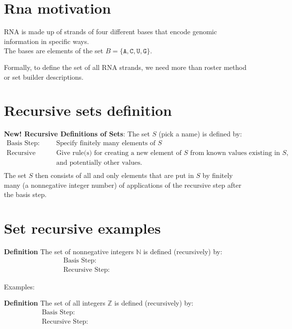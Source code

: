 \documentclass[12pt, oneside]{article}
\newcommand{\A}[0]{\texttt{A}}
\newcommand{\C}[0]{\texttt{C}}
\newcommand{\G}[0]{\texttt{G}}
\newcommand{\U}[0]{\texttt{U}}
\begin{document}
\begin{flushright}
\end{flushright} \section*{Rna motivation}


RNA is made up of strands of four different bases that encode genomic information
in specific ways.\\
The bases are elements of the set 
$B  = \{\A, \C, \U, \G \}$.


Formally, to define the set of all RNA strands, we need more than roster
method or set builder descriptions. 

 \vfill
\section*{Recursive sets definition}


{\bf New! Recursive Definitions of Sets}: The set $S$ (pick a name) is defined by:
\[
\begin{array}{ll}
\textrm{Basis Step: } & \textrm{Specify finitely many elements of } S\\
\textrm{Recursive Step: } & \textrm{Give rule(s) for creating a new element of } S \textrm{ from known values existing in } S, \\
& \textrm{and potentially other values}. \\
\end{array}
\]
The set $S$ then consists of all and only elements that are put in $S$ by finitely many (a nonnegative integer number) of
applications of the recursive step after the basis step. \vfill
\section*{Set recursive examples}


{\bf Definition} The set of nonnegative integers $\mathbb{N}$ is defined (recursively) by: 
\[
\begin{array}{ll}
\textrm{Basis Step: } & \phantom{0 \in \mathbb{N}} \\
\textrm{Recursive Step: } & \phantom{\textrm{If } n \in \mathbb{N} \textrm{, then } n+1 \in \mathbb{N}}
\end{array}
\]

Examples: 

{\bf Definition} The set of all integers $\mathbb{Z}$ is defined (recursively) by: 
\[
\begin{array}{ll}
\textrm{Basis Step: } & \phantom{0 \in \mathbb{Z}} \\
\textrm{Recursive Step: } & \phantom{\textrm{If } x \in \mathbb{Z} \textrm{, then } x+1 \in \mathbb{Z}
\textrm{ and } x-1 \in \mathbb{Z}}
\end{array}
\]
\end{document}
